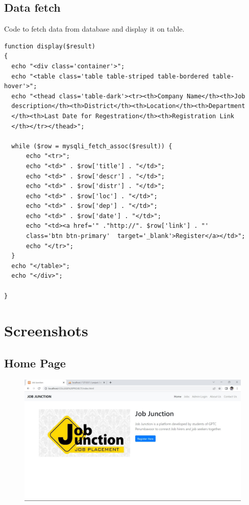 \documentclass[a4paper,11pt]{report}
\begin{document}
\section{Data fetch}
Code to fetch data from database and display it on table.
\begin{verbatim}
function display($result)
{
  echo "<div class='container'>";
  echo "<table class='table table-striped table-bordered table-hover'>";
  echo "<thead class='table-dark'><tr><th>Company Name</th><th>Job 
  description</th><th>District</th><th>Location</th><th>Department
  </th><th>Last Date for Regestration</th><th>Registration Link
  </th></tr></thead>";
  
  while ($row = mysqli_fetch_assoc($result)) {
      echo "<tr>";
      echo "<td>" . $row['title'] . "</td>";
      echo "<td>" . $row['descr'] . "</td>";
      echo "<td>" . $row['distr'] . "</td>";
      echo "<td>" . $row['loc'] . "</td>";
      echo "<td>" . $row['dep'] . "</td>";
      echo "<td>" . $row['date'] . "</td>";
      echo "<td><a href='" ."http://". $row['link'] . "'
      class='btn btn-primary'  target='_blank'>Register</a></td>";
      echo "</tr>";
  }
  echo "</table>";
  echo "</div>";
  
}
\end{verbatim}



\chapter{Screenshots}

\section{Home Page}
\begin{figure}[h]
	\centering
	\hspace{21pt}
	\includegraphics[width=.70\linewidth]{job10.jpeg}
	\label{fig:jop10.jpeg}
\end{figure}
\end{document}
